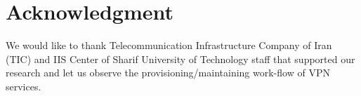 \documentclass[10pt,conference]{IEEEtran}
\begin{document}
\section*{Acknowledgment}


We would like to thank Telecommunication Infrastructure Company of Iran (TIC)
and IIS Center of Sharif University of Technology staff
that supported our research and let us observe the provisioning/maintaining work-flow of VPN services. 











\end{document}

